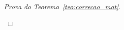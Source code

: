 \begin{proof}[Prova do Teorema~\ref{teo:correcao_mat}]
\begin{provaporcasos}
\begin{provaporsubcasos}
\begin{center}

\end{center}
\end{provaporsubcasos}
\end{provaporcasos}
\end{proof}
